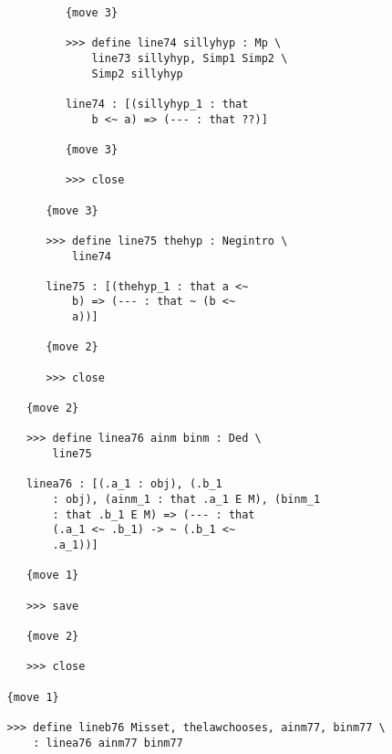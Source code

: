 \documentclass[12pt]{article}
\begin{document}
\begin{verbatim}
            {move 3}

            >>> define line74 sillyhyp : Mp \
                line73 sillyhyp, Simp1 Simp2 \
                Simp2 sillyhyp

            line74 : [(sillyhyp_1 : that 
                b <~ a) => (--- : that ??)]

            {move 3}

            >>> close

         {move 3}

         >>> define line75 thehyp : Negintro \
             line74

         line75 : [(thehyp_1 : that a <~ 
             b) => (--- : that ~ (b <~ 
             a))]

         {move 2}

         >>> close

      {move 2}

      >>> define linea76 ainm binm : Ded \
          line75

      linea76 : [(.a_1 : obj), (.b_1 
          : obj), (ainm_1 : that .a_1 E M), (binm_1 
          : that .b_1 E M) => (--- : that 
          (.a_1 <~ .b_1) -> ~ (.b_1 <~ 
          .a_1))]

      {move 1}

      >>> save

      {move 2}

      >>> close

   {move 1}

   >>> define lineb76 Misset, thelawchooses, ainm77, binm77 \
       : linea76 ainm77 binm77


\end{verbatim}
\end{document}
